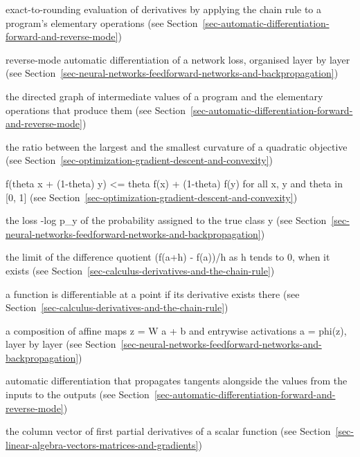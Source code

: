 \documentclass[
  english,
  11pt,
  a4paper,
  twoside,
  open=any,
  numbers=noenddot]{scrbook}
\providecommand{\tightlist}{%
  \setlength{\itemsep}{0pt}\setlength{\parskip}{0pt}}
\theoremstyle{plain}
\theoremstyle{plain}
\theoremstyle{plain}
\theoremstyle{definition}
\theoremstyle{definition}
\theoremstyle{definition}
\theoremstyle{remark}
\begin{document}
\begin{description}
\tightlist
\item[\textbf{automatic differentiation}]
exact-to-rounding evaluation of derivatives by applying the chain rule
to a program's elementary operations (see
Section~\ref{sec-automatic-differentiation-forward-and-reverse-mode})
\item[\textbf{backpropagation}]
reverse-mode automatic differentiation of a network loss, organised
layer by layer (see
Section~\ref{sec-neural-networks-feedforward-networks-and-backpropagation})
\item[\textbf{computational graph}]
the directed graph of intermediate values of a program and the
elementary operations that produce them (see
Section~\ref{sec-automatic-differentiation-forward-and-reverse-mode})
\item[\textbf{condition number}]
the ratio between the largest and the smallest curvature of a quadratic
objective (see
Section~\ref{sec-optimization-gradient-descent-and-convexity})
\item[\textbf{convex function}]
f(theta x + (1-theta) y) \textless= theta f(x) + (1-theta) f(y) for all
x, y and theta in {[}0, 1{]} (see
Section~\ref{sec-optimization-gradient-descent-and-convexity})
\item[\textbf{cross-entropy}]
the loss -log p\_y of the probability assigned to the true class y (see
Section~\ref{sec-neural-networks-feedforward-networks-and-backpropagation})
\item[\textbf{derivative}]
the limit of the difference quotient (f(a+h) - f(a))/h as h tends to 0,
when it exists (see
Section~\ref{sec-calculus-derivatives-and-the-chain-rule})
\item[\textbf{differentiable}]
a function is differentiable at a point if its derivative exists there
(see Section~\ref{sec-calculus-derivatives-and-the-chain-rule})
\item[\textbf{feedforward network}]
a composition of affine maps z = W a + b and entrywise activations a =
phi(z), layer by layer (see
Section~\ref{sec-neural-networks-feedforward-networks-and-backpropagation})
\item[\textbf{forward mode}]
automatic differentiation that propagates tangents alongside the values
from the inputs to the outputs (see
Section~\ref{sec-automatic-differentiation-forward-and-reverse-mode})
\item[\textbf{gradient}]
the column vector of first partial derivatives of a scalar function (see
Section~\ref{sec-linear-algebra-vectors-matrices-and-gradients})

\end{description}
\end{document}
